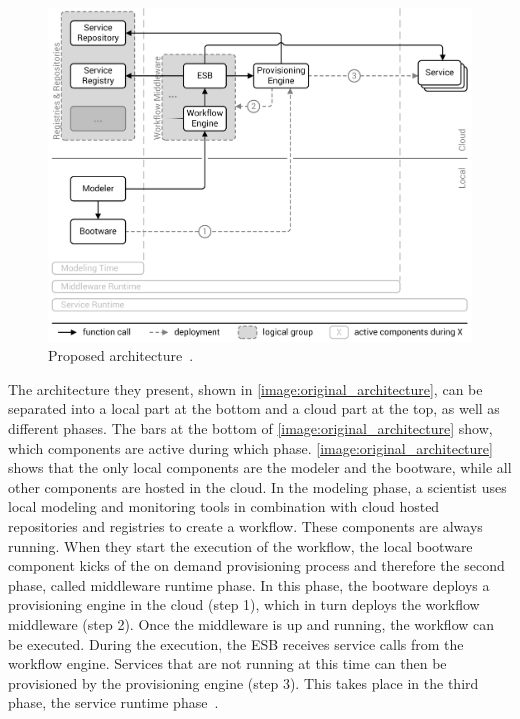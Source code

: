 \begin{figure}[!htbp]
	\centering
	\includegraphics[resolution=600]{previous/assets/original_architecture}
	\caption{Proposed architecture~\autocite[based on][]{provisioning:ondemand}.}
	\label{image:original_architecture}
\end{figure}

The architecture they present, shown in \autoref{image:original_architecture}, can be separated into a local part at the bottom and a cloud part at the top, as well as different phases.
The bars at the bottom of \autoref{image:original_architecture} show, which components are active during which phase.
\autoref{image:original_architecture} shows that the only local components are the modeler and the bootware, while all other components are hosted in the cloud.
In the modeling phase, a scientist uses local modeling and monitoring tools in combination with cloud hosted repositories and registries to create a workflow.
These components are always running.
When they start the execution of the workflow, the local bootware component kicks of the on demand provisioning process and therefore the second phase, called middleware runtime phase.
In this phase, the bootware deploys a provisioning engine in the cloud (step 1), which in turn deploys the workflow middleware (step 2).
Once the middleware is up and running, the workflow can be executed. During the execution, the ESB receives service calls from the workflow engine.
Services that are not running at this time can then be provisioned by the provisioning engine (step 3).
This takes place in the third phase, the service runtime phase~\autocite{provisioning:ondemand}.
